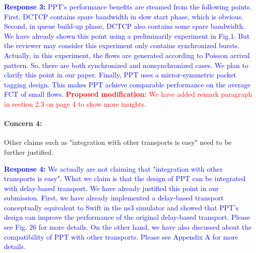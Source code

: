 \documentclass[12pt,one-column]{article}
\begin{document}
\noindent\textcolor{blue}{\textbf{Response 3:} 
PPT's performance benefits are steamed from the following points. First, DCTCP contains spare bandwidth in slow start phase, which is obvious.
Second, in queue build-up phase, DCTCP also contains some spare bandwidth. We have already shown this point using a preliminarily experiment in Fig.1. But the reviewer may consider this experiment only contains synchronized bursts. Actually, in this experiment, the flows are generated according to Poisson arrival  pattern. So, there are both synchronized and nonsynchronized cases. We plan to clarify this point in our paper.
Finally, PPT uses a mirror-symmetric packet tagging design. This makes PPT achieve comparable performance on the average FCT of small flows.
}
\noindent\textcolor{red}{\textbf{Proposed modification: }
We have added remark paragraph in section 2.3 on page 4 to show more insights.
}


{\it \paragraph{Concern 4:} Other claims such as "integration with other transports is easy" need to be further justified.}

\noindent\textcolor{blue}{\textbf{Response 4:} 
We actually are not claiming that "integration with other transports is easy".
What we claim is that the design of PPT can be integrated with delay-based transport.
We have already justified this point in our submission.
First, we have already implemented a delay-based transport conceptually equivalent to Swift in the ns3 simulator and showed that PPT's design can improve the performance of the original delay-based transport. Please see Fig. 26 for more details.
On the other hand, we have also discussed about the compatibility of PPT with other transports. Please see Appendix A for more details.
}
\end{document}
